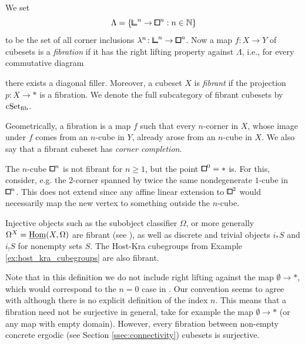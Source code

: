 \begin{definition}\label{def:nil-fibration}
We set
\[
    \Lambda = \{{\bbcor}^n\to{\bbox}^n : n\in\N\}
\]
to be the set of all corner inclusions $\lambda^n\colon{\bbcor}^n\to{\bbox}^n$.
Now a map $f\colon X\to Y$ of cubesets is a \emph{fibration}
if it has the right lifting property against $\Lambda$, i.e.,
for every commutative diagram
\begin{center}
\end{center}
there exists a diagonal filler.
Moreover, a cubeset $X$ is \emph{fibrant} if the projection $p\colon X\to\ast$ is a fibration.
We denote the full subcategory of fibrant cubesets by ${\mathrm{cSet}_\mathrm{fib}}$.
\end{definition}

Geometrically, a fibration is a map $f$ such that every $n$-corner in $X$,
whose image under $f$ comes from an $n$-cube in $Y$, already arose from an $n$-cube in $X$.
We also say that a fibrant cubeset has \emph{corner completion}.

\begin{example}
The $n$-cube ${\bbox}^n$ is not fibrant for $n\geq 1$, but the point ${\bbox}^0=\ast$ is.
For this, consider, e.g. the $2$-corner spanned by twice the same nondegenerate $1$-cube in ${\bbox}^n$.
This does not extend since any affine linear extension to $\bbox^2$ would necessarily map the new vertex to something outside the $n$-cube.

Injective objects such as the subobject classifier $\Omega$, or more generally $\Omega^X=\underline{\operatorname{Hom}}(X,\Omega)$ are fibrant (see \cite[Chapter IV.10, Corollary 2]{MacLane1994}),
as well as discrete and trivial objects $i_\ast S$ and $i_!S$ for nonempty sets $S$.
The Host-Kra cubegroups from Example \ref{ex:host_kra_cubegroups} are also fibrant.
\end{example}

\begin{remark}
Note that in this definition we do not include right lifting against the map $\emptyset\to\ast$,
which would correspond to the $n=0$ case in \cite[Definition 7.1]{Gutman2020}.
Our convention seems to agree with \cite[Definition 3.3.7, Lemma 3.3.9]{Candela2017} although there is no explicit definition of the index $n$.
This means that a fibration need not be surjective in general, take for example the map $\emptyset\to\ast$ (or any map with empty domain).
However, every fibration between non-empty concrete ergodic (see Section \ref{ssec:connectivity}) cubesets is surjective.
\end{remark}


